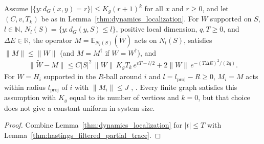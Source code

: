 \begin{lemma}
    \label{thm:hastings05_filtered_approximation_graph}
    \leanok
    Assume $|\{y:d_G(x,y)=r\}|\le K_g(r+1)^k$ for all $x$ and $r\ge0$, and let
    $(C,v,T_k)$ be as in Lemma~\ref{thm:dynamics_localization}.
    For $W$ supported on $S$, $l\in\mathbb N$, $N_l(S)=\{y:d_G(y,S)\le l\}$,
    positive local dimension, $q,T\ge0$, and $\Delta E\in\mathbb R$, the
    operator $M=\mathbb E_{N_l(S)}(\widetilde W)$ acts on $N_l(S)$, satisfies
    $\|M\|\le\|W\|$ (and $M=M^\dagger$ if $W=W^\dagger$), and
    \begin{align}
        \|\widetilde W-M\|\le C|S|^2\,\|W\|\,K_gT_k\,e^{vT-l/2}
        +2\|W\|\,e^{-(T\Delta E)^2/(2q)}.
        \label{eq:hastings05_filtered_graph_approximation}
    \end{align}
    For $W=H_i$ supported in the $R$-ball around $i$ and
    $l=l_{\mathrm{proj}}-R\ge0$, $M_i=M$ acts within radius
    $l_{\mathrm{proj}}$ of $i$ with $\|M_i\|\le J$
    \cite[lines 285--320]{Hastings2006Solving},
    \cite{gap:hastings05_filtered_term_approximation}.
    Every finite graph satisfies this assumption with $K_g$ equal to its
    number of vertices and $k=0$, but that choice does not give a constant
    uniform in system size\cite{gap:hastings05_geometric_growth_scope}.
\end{lemma}
\begin{proof}\leanok
    Combine Lemma~\ref{thm:dynamics_localization} for $|t|\le T$
    with Lemma~\ref{thm:hastings_filtered_partial_trace}.
\end{proof}

